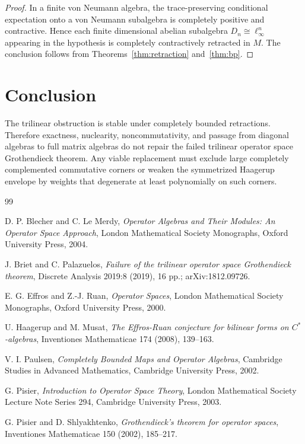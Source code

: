 \documentclass[11pt]{amsart}
\theoremstyle{definition}
\begin{document}
\begin{proof}
In a finite von Neumann algebra, the trace-preserving conditional expectation
onto a von Neumann subalgebra is completely positive and contractive. Hence
each finite dimensional abelian subalgebra
$D_n\cong\ell_\infty^n$ appearing in the hypothesis is completely
contractively retracted in $M$. The conclusion follows from
Theorems~\ref{thm:retraction} and~\ref{thm:bp}.
\end{proof}

\section{Conclusion}

The trilinear obstruction is stable under completely bounded retractions.
Therefore exactness, nuclearity, noncommutativity, and passage from diagonal
algebras to full matrix algebras do not repair the failed trilinear operator
space Grothendieck theorem. Any viable replacement must exclude large
completely complemented commutative corners or weaken the symmetrized
Haagerup envelope by weights that degenerate at least polynomially on such
corners.

\begin{thebibliography}{99}

D. P. Blecher and C. Le Merdy,
\emph{Operator Algebras and Their Modules: An Operator Space Approach},
London Mathematical Society Monographs, Oxford University Press, 2004.

J. Briet and C. Palazuelos,
\emph{Failure of the trilinear operator space Grothendieck theorem},
Discrete Analysis 2019:8 (2019), 16 pp.; arXiv:1812.09726.

E. G. Effros and Z.-J. Ruan,
\emph{Operator Spaces},
London Mathematical Society Monographs, Oxford University Press, 2000.

U. Haagerup and M. Musat,
\emph{The Effros-Ruan conjecture for bilinear forms on $C^*$-algebras},
Inventiones Mathematicae 174 (2008), 139--163.

V. I. Paulsen,
\emph{Completely Bounded Maps and Operator Algebras},
Cambridge Studies in Advanced Mathematics, Cambridge University Press, 2002.

G. Pisier,
\emph{Introduction to Operator Space Theory},
London Mathematical Society Lecture Note Series 294, Cambridge University
Press, 2003.

G. Pisier and D. Shlyakhtenko,
\emph{Grothendieck's theorem for operator spaces},
Inventiones Mathematicae 150 (2002), 185--217.

\end{thebibliography}
\end{document}
